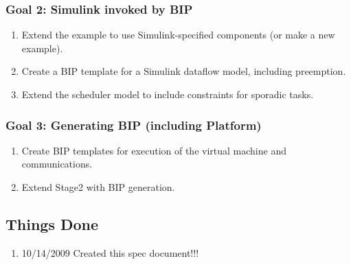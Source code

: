 \subsubsection{Goal 2: Simulink invoked by BIP}
\begin{enumerate}
\item Extend the example to use Simulink-specified components (or make a new example).
\item Create a BIP template for a Simulink dataflow model, including preemption.
\item Extend the scheduler model to include constraints for sporadic tasks.
\end{enumerate}

\subsubsection{Goal 3: Generating BIP (including Platform)}
\begin{enumerate}
\item Create BIP templates for execution of the virtual machine and communications.
\item Extend Stage2 with BIP generation.
\end{enumerate}

\subsection{Things Done}

\begin{enumerate}
\item 10/14/2009 Created this spec document!!!
\end{enumerate}